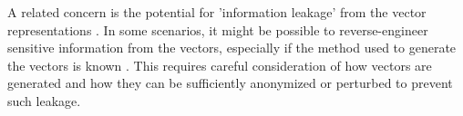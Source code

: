 A related concern is the potential for 'information leakage' from the vector representations . In some scenarios, it might be possible to reverse-engineer sensitive information from the vectors, especially if the method used to generate the vectors is known \cite{DBLP:journals/corr/abs-2205-10364}. This requires careful consideration of how vectors are generated and how they can be sufficiently anonymized or perturbed to prevent such leakage.

